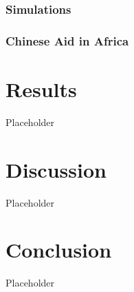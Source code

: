 \documentclass[11pt]{article}
\begin{document}
\subsubsection{Simulations}


\subsubsection{Chinese Aid in Africa}
\newpage

\section{Results}
Placeholder
\newpage

\section{Discussion}
Placeholder
\newpage

\section{Conclusion}
Placeholder
\newpage

\end{document}

